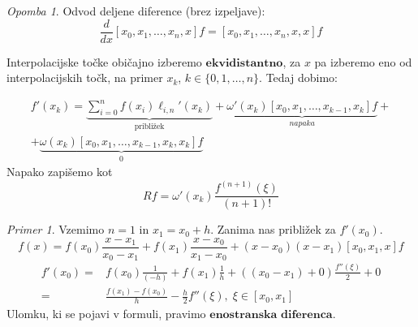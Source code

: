 \documentclass[a4paper,12pt]{article}
\theoremstyle{definition}
\theoremstyle{remark}
\newtheorem*{ex}{Primer}
\newtheorem*{rem}{Opomba}
\begin{document}
\begin{rem}
    Odvod deljene diference (brez izpeljave):
    \begin{equation*}
        \frac{d}{dx} [x_0, x_1, \dots, x_n, x] f = [x_0, x_1, \dots, x_n, x, x] f
    \end{equation*}
\end{rem}

Interpolacijske točke običajno izberemo $\textbf{ekvidistantno}$, za $x$ pa izberemo eno od interpolacijskih točk, na primer 
$x_k$, $k \in \{0, 1, \dots, n\}$. Tedaj dobimo:

\begin{multline*}
    f'(x_k) = \underbrace{\sum_{i=0}^{n}f(x_i) \ell_{i, n}'(x_k)}_{\text{približek}} + \underbrace{\omega'(x_k) [x_0, x_1, \dots, x_{k-1}, x_k] f}_{napaka} + \\
    + \underbrace{\omega(x_k) [x_0, x_1, \dots, x_{k-1}, x_k, x_k] f}_{0}
\end{multline*}
Napako zapišemo kot
\begin{equation*}
    Rf = \omega'(x_k) \frac{f^{(n+1)}(\xi)}{(n+1)!}
\end{equation*}

\begin{ex}
    Vzemimo $n=1$ in $x_1 = x_0 + h$. Zanima nas približek za $f'(x_0)$.
    \begin{equation*}
        f(x) = f(x_0) \frac{x-x_1}{x_0-x_1} + f(x_1) \frac{x-x_0}{x_1-x_0} + (x-x_0)(x-x_1)[x_0, x_1, x]f
    \end{equation*}
    \begin{align*}
        f'(x_0) =& f(x_0) \frac{1}{(-h)} + f(x_1) \frac{1}{h} + ((x_0 - x_1)+0)\frac{f''(\xi)}{2} + 0 \\
                =& \frac{f(x_1)-f(x_0)}{h} - \frac{h}{2} f''(\xi), \; \xi \in [x_0, x_1]
    \end{align*}
    Ulomku, ki se pojavi v formuli, pravimo $\textbf{enostranska diferenca}$.
\end{ex}
\end{document}
